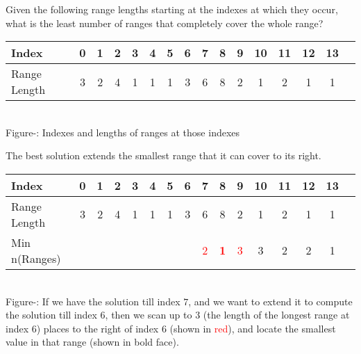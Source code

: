 \documentclass[11pt]{article}
\newcounter{fignum}
\begin{document}
Given the following range lengths starting at the indexes at which
they occur, what is the least number of ranges that completely cover
the whole range?

\begin{center}
  \begin{tabular}{|l|c|c|c|c|c|c|c|c|c|c|c|c|c|c|c|}
    \hline
    Index        & 0 & 1 & 2 & 3 & 4 & 5 & 6 & 7 & 8 & 9 &10 &11 &12 &13\\
    \hline
    Range Length & 3 & 2 & 4 & 1 & 1 & 1 & 3 & 6 & 8 & 2 & 1 & 2 & 1 & 1\\
    \hline
  \end{tabular}\\
  \vspace{0.3cm}
  \footnotesize{Figure-: Indexes and lengths of ranges
    at those indexes}
  \addtocounter{fignum}{1}
\end{center}

The best solution extends the smallest range that it can cover to its
right.

\begin{center}
  \begin{tabular}{|l|c|c|c|c|c|c|c|c|c|c|c|c|c|c|c|}
    \hline
    Index         & 0 & 1 & 2 & 3 & 4 & 5 & 6 & 7 & 8 & 9 &10 &11 &12 &13\\
    \hline
    Range Length  & 3 & 2 & 4 & 1 & 1 & 1 & 3 & 6 & 8 & 2 & 1 & 2 & 1 & 1\\
    \hline
    Min n(Ranges) &  &  &  &  &  &  &  & \textcolor{red}{2} & \textbf{\textcolor{red}{1}} & \textcolor{red}{3} & 3 & 2 & 2 & 1\\
    \hline
  \end{tabular}\\
  \vspace{0.3cm}
  \footnotesize{Figure-: If we have the solution till index
    $7$, and we want to extend it to compute the solution till index
    $6$, then we scan up to $3$ (the length of the longest range at
    index $6$) places to the right of index $6$ (shown in
    \textcolor{red}{red}), and locate the smallest value in that range
    (shown in bold face).}
  \addtocounter{fignum}{1}
\end{center}
\end{document}
